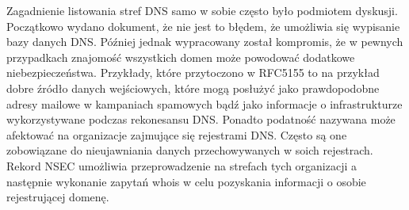 Zagadnienie listowania stref DNS samo w sobie często było podmiotem dyskusji. Początkowo wydano dokument, że nie jest to błędem, że umożliwia się wypisanie bazy danych DNS\cite{RFC4033}. Później jednak wypracowany został kompromis\cite{RFC5155}, że w pewnych przypadkach znajomość wszystkich domen może powodować dodatkowe niebezpieczeństwa. Przykłady, które przytoczono w RFC5155\cite{RFC5155} to na przykład dobre źródło danych wejściowych, które mogą posłużyć jako prawdopodobne adresy mailowe w kampaniach spamowych bądź jako informacje o infrastrukturze wykorzystywane podczas rekonesansu DNS. Ponadto podatność nazywana  może afektować na organizacje zajmujące się rejestrami DNS. Często są one zobowiązane do nieujawniania danych przechowywanych w soich rejestrach. Rekord NSEC umożliwia przeprowadzenie  na strefach tych organizacji a następnie wykonanie zapytań whois\cite{RFC3912} w celu pozyskania informacji o osobie rejestrującej domenę. 